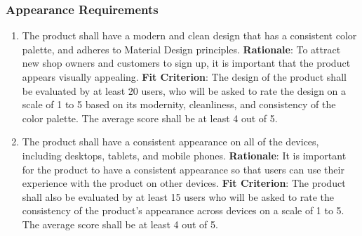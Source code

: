 \documentclass[12pt]{article}
\begin{document}
\subsubsection{Appearance Requirements}
\begin{enumerate}[label = NFR-\arabic*, left=\parindent, series=nfr]
    \item The product shall have a modern and clean design that has a consistent color palette, and adheres to Material Design principles.
    \newline \textbf{Rationale}: To attract new shop owners and customers to sign up, it is important that the product appears visually appealing. 
    \newline \textbf{Fit Criterion}: The design of the product shall be evaluated by at least 20 users, who will be asked to rate the design on a scale of 1 to 5 based on its modernity, cleanliness, and consistency of the color palette. The average score shall be at least 4 out of 5.
    
    \item The product shall have a consistent appearance on all of the devices, including desktops, tablets, and mobile phones.
    \newline \textbf{Rationale}: It is important for the product to have a consistent appearance so that users can use their experience with the product on other devices. 
    \newline \textbf{Fit Criterion}: The product shall also be evaluated by at least 15 users who will be asked to rate the consistency of the product's appearance across devices on a scale of 1 to 5. The average score shall be at least 4 out of 5.

\end{enumerate}
\end{document}
